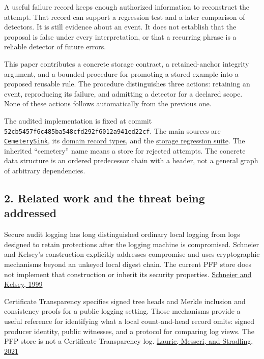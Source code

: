 \documentclass[
  11pt,
]{article}
\newcommand{\passthrough}[1]{#1}
\begin{document}
A useful failure record keeps enough authorized information to
reconstruct the attempt. That record can support a regression test and a
later comparison of detectors. It is still evidence about an event. It
does not establish that the proposal is false under every
interpretation, or that a recurring phrase is a reliable detector of
future errors.

This paper contributes a concrete storage contract, a retained-anchor
integrity argument, and a bounded procedure for promoting a stored
example into a proposed reusable rule. The procedure distinguishes three
actions: retaining an event, reproducing its failure, and admitting a
detector for a declared scope. None of these actions follows
automatically from the previous one.

The audited implementation is fixed at commit
\nolinkurl{52cb5457f6c485ba548cfd292f6012a941ed22cf}. The main sources
are
\href{https://github.com/dbccpage/the_symbol_game/blob/52cb5457f6c485ba548cfd292f6012a941ed22cf/symbol_game/infrastructure/persistence/cemetery_sink.py}{\passthrough{\lstinline!CemeterySink!}},
its
\href{https://github.com/dbccpage/the_symbol_game/blob/52cb5457f6c485ba548cfd292f6012a941ed22cf/symbol_game/domain/entities/cemetery_entry.py}{domain
record types}, and the
\href{https://github.com/dbccpage/the_symbol_game/blob/52cb5457f6c485ba548cfd292f6012a941ed22cf/symbol_game/tests/test_cemetery_sink.py}{storage
regression suite}. The inherited ``cemetery'' name means a store for
rejected attempts. The concrete data structure is an ordered predecessor
chain with a header, not a general graph of arbitrary dependencies.

\subsection{2. Related work and the threat being
addressed}\label{related-work-and-the-threat-being-addressed}

Secure audit logging has long distinguished ordinary local logging from
logs designed to retain protections after the logging machine is
compromised. Schneier and Kelsey's construction explicitly addresses
compromise and uses cryptographic mechanisms beyond an unkeyed local
digest chain. The current PFP store does not implement that construction
or inherit its security properties.
\href{https://www.schneier.com/academic/archives/1999/05/secure_audit_logs_to.html}{Schneier
and Kelsey, 1999}

Certificate Transparency specifies signed tree heads and Merkle
inclusion and consistency proofs for a public logging setting. Those
mechanisms provide a useful reference for identifying what a local
count-and-head record omits: signed producer identity, public witnesses,
and a protocol for comparing log views. The PFP store is not a
Certificate Transparency log.
\href{https://www.rfc-editor.org/rfc/rfc9162.html}{Laurie, Messeri, and
Stradling, 2021}
\end{document}
